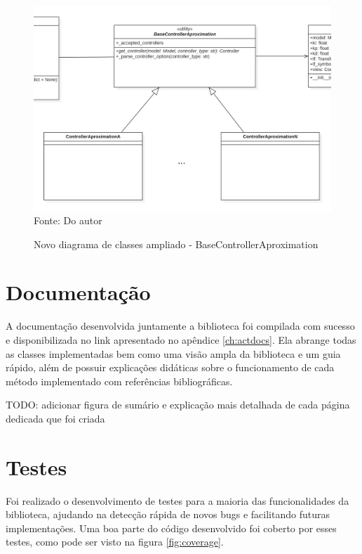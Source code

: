 \begin{figure}[H]
    \centering
    \caption{Novo diagrama de classes ampliado - BaseControllerAproximation}
    \includegraphics[scale=0.40]{figuras/class_diag_bcacontroller_new}
    \label{fig:class_diag_bcacontroller_new}
    \\
    \vspace{0cm}\hspace{0cm}\small{Fonte: Do autor}
\end{figure}


\section{Documentação}

A documentação desenvolvida juntamente a biblioteca foi compilada com sucesso e disponibilizada no link apresentado
no apêndice \ref{ch:actdocs}.
Ela abrange todas as classes implementadas bem como uma visão ampla da biblioteca e um guia rápido, além de possuir
explicações didáticas sobre o funcionamento de cada método implementado com referências bibliográficas.

TODO: adicionar figura de sumário e explicação mais detalhada de cada página dedicada que foi criada


\section{Testes}

Foi realizado o desenvolvimento de testes para a maioria das funcionalidades da biblioteca, ajudando na detecção
rápida de novos bugs e facilitando futuras implementações.
Uma boa parte do código desenvolvido foi coberto por esses testes, como pode ser visto na figura \ref{fig:coverage}.

